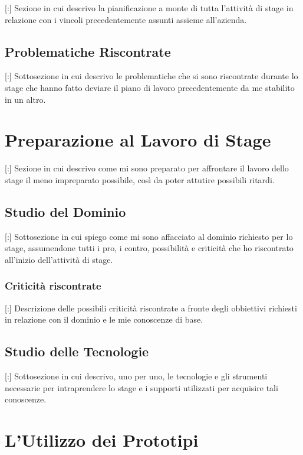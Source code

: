 \documentclass[11pt]{book}              %
\begin{document}
[:] Sezione in cui descrivo la pianificazione a monte di tutta l'attività di stage in relazione con i vincoli precedentemente assunti assieme all'azienda.

\subsection{Problematiche Riscontrate}

[:] Sottosezione in cui descrivo le problematiche che si sono riscontrate durante lo stage che hanno fatto deviare il piano di lavoro precedentemente da me stabilito in un altro.

\section{Preparazione al Lavoro di Stage}

[:] Sezione in cui descrivo come mi sono preparato per affrontare il lavoro dello stage il meno impreparato possibile, così da poter attutire possibili ritardi.

\subsection{Studio del Dominio}

[:] Sottosezione in cui spiego come mi sono affacciato al dominio richiesto per lo stage, assumendone tutti i pro, i contro, possibilità e criticità che ho riscontrato all'inizio dell'attività di stage.

\subsubsection{Criticità riscontrate}

[:] Descrizione delle possibili criticità riscontrate a fronte degli obbiettivi richiesti in relazione con il dominio e le mie conoscenze di base.

\subsection{Studio delle Tecnologie}

[:] Sottosezione in cui descrivo, uno per uno, le tecnologie e gli strumenti necessarie per intraprendere lo stage e i supporti utilizzati per acquisire tali conoscenze.



\section{L'Utilizzo dei Prototipi}
\end{document}
